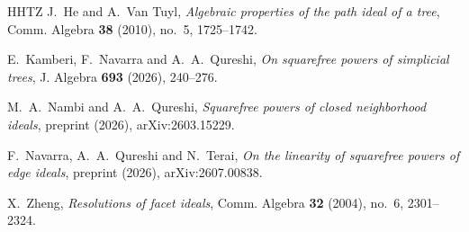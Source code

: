 \documentclass{amsart}
\theoremstyle{definition}
\theoremstyle{remark}
\begin{document}
\begin{thebibliography}{HHTZ}
J.~He and A.~Van Tuyl, \emph{Algebraic properties of the path ideal of a tree}, Comm. Algebra \textbf{38} (2010), no.~5, 1725--1742.

E.~Kamberi, F.~Navarra and A.~A.~Qureshi, \emph{On squarefree powers of simplicial trees}, J. Algebra \textbf{693} (2026), 240--276.

M.~A.~Nambi and A.~A.~Qureshi, \emph{Squarefree powers of closed neighborhood ideals}, preprint (2026), arXiv:2603.15229.


F.~Navarra, A.~A.~Qureshi and N.~Terai,
\emph{On the linearity of squarefree powers of edge ideals},
preprint (2026), arXiv:2607.00838.


X.~Zheng, \emph{Resolutions of facet ideals}, Comm. Algebra \textbf{32} (2004), no.~6, 2301--2324.

\end{thebibliography}
\end{document}

